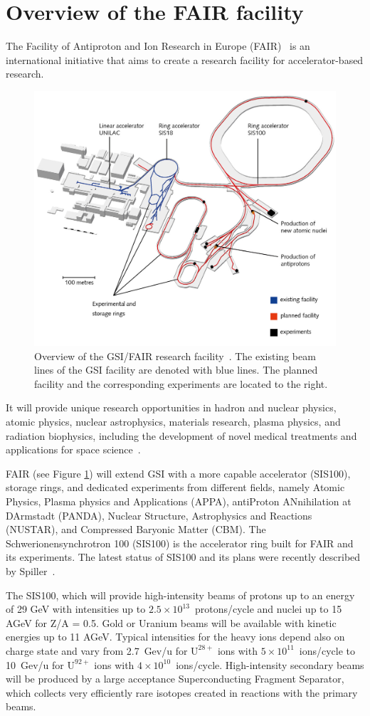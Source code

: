 \section{Overview of the FAIR facility}
The Facility of Antiproton and Ion Research in Europe (\gls{FAIR})~\cite{fair} is an international initiative that aims to create a research facility for accelerator-based research. 

\begin{figure}[!h]
    \centering
    \includegraphics[width=0.75\columnwidth]{Chapter2/images/fair.jpg}
    \caption{Overview of the GSI/FAIR research facility~\cite{fair}. The existing beam lines of the \gls{GSI} facility are denoted with blue lines. The planned facility and the corresponding experiments are located to the right.}
    \label{fig:fair}
\end{figure}

It will provide unique research opportunities in hadron and nuclear physics, atomic physics, nuclear astrophysics, materials research, plasma physics, and radiation biophysics, including the development of novel medical treatments and applications for space science~\cite{fair1}. 
 
FAIR (see Figure \ref{fig:fair}) will extend GSI with a more capable accelerator (SIS100), storage rings, and dedicated experiments from different fields, namely Atomic Physics, Plasma physics and Applications (APPA), antiProton ANnihilation at DArmstadt (PANDA), Nuclear Structure, Astrophysics and Reactions (NUSTAR), and Compressed Baryonic Matter (\gls{CBM}). The Schwerionensynchrotron 100 (SIS100) is
the accelerator ring built for FAIR and its experiments. The latest status of SIS100 and its plans were recently described by Spiller~\cite{Spiller_2020}.

The SIS100, which will provide high-intensity beams of protons up
to an energy of 29 GeV  with intensities up to $2.5\times 10^{13}$~protons/cycle and nuclei up to 15 AGeV for Z/A = 0.5. Gold or Uranium beams will be available with kinetic energies up to 11 AGeV. Typical intensities for the heavy ions depend also on charge state and vary from 2.7~Gev/u for $\mathrm{U^{28+}}$ ions with $5\times 10^{11}$~ions/cycle to 10~Gev/u for $\mathrm{U^{92+}}$ ions with $4\times 10^{10}$~ions/cycle. High-intensity secondary beams will be produced by a large acceptance Superconducting Fragment Separator, which collects very efficiently rare isotopes created in reactions with the primary beams. 